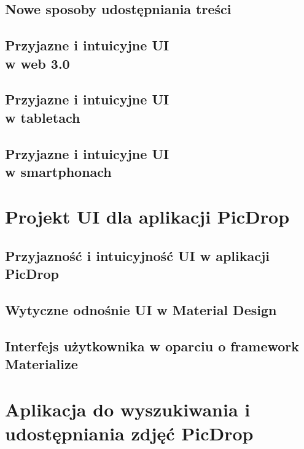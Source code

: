 \documentclass[brudnopis]{xmgr}
\begin{document}
\section{Nowe sposoby udostępniania treści}

\section{Przyjazne i intuicyjne UI\\ w web 3.0}

\section{Przyjazne i intuicyjne UI\\ w tabletach}

\section{Przyjazne i intuicyjne UI\\ w smartphonach}

\chapter{Projekt UI dla aplikacji PicDrop}

\section{Przyjazność i intuicyjność  UI w aplikacji PicDrop }
\section{Wytyczne odnośnie UI w Material Design}
\section{Interfejs użytkownika w oparciu o framework Materialize }


\chapter{Aplikacja do wyszukiwania i udostępniania zdjęć PicDrop}
\end{document}
